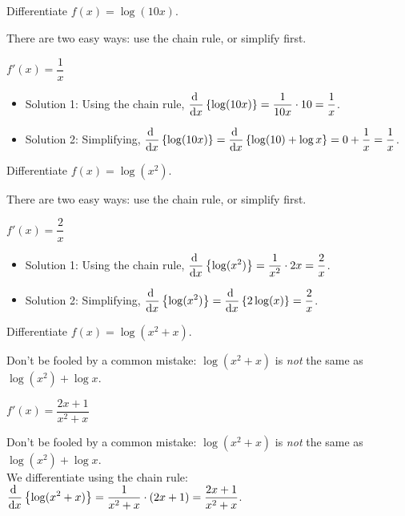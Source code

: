 \subsection*{\Procedural}
\begin{Mquestion}
Differentiate $f(x)=\log(10x)$.
\end{Mquestion}
\begin{hint}
There are two easy ways: use the chain rule, or simplify first.
\end{hint}
\begin{answer}
$f'(x)=\dfrac{1}{x}$
\end{answer}
\begin{solution}
\begin{itemize}
\item Solution 1: Using the chain rule, $\ds\diff{}{x}\left\{\log(10x)\right\}=\dfrac{1}{10x}\cdot 10=\frac{1}{x}$.
\item Solution 2: Simplifying,
$\ds\diff{}{x}\left\{\log(10x)\right\}=\ds\diff{}{x}\left\{\log(10)+\log x\right\} = 0+\frac{1}{x}=\frac{1}{x}$.
\end{itemize}
\end{solution}

\begin{Mquestion}
Differentiate $f(x)=\log(x^2)$.
\end{Mquestion}
\begin{hint}
There are two easy ways: use the chain rule, or simplify first.
\end{hint}
\begin{answer}
$f'(x)=\dfrac{2}{x}$
\end{answer}
\begin{solution}
\begin{itemize}
\item Solution 1: Using the chain rule,
$\ds\diff{}{x}\left\{\log(x^2)\right\}=\frac{1}{x^2}\cdot 2x = \frac{2}{x}$.
\item Solution 2: Simplifying,
$\ds\diff{}{x}\left\{\log(x^2)\right\}= \ds\diff{}{x}\left\{2\log(x)\right\}=   \frac{2}{x}$.
\end{itemize}
\end{solution}

\begin{Mquestion}
Differentiate $f(x)=\log(x^2+x)$.
\end{Mquestion}
\begin{hint}
Don't be fooled by a common mistake: $\log(x^2+x)$ is \emph{not} the same as $\log(x^2)+\log x$.
\end{hint}
\begin{answer}
$f'(x)=\dfrac{2x+1}{x^2+x}$
\end{answer}
\begin{solution}
Don't be fooled by a common mistake: $\log(x^2+x)$ is \emph{not} the same as $\log(x^2)+\log x$. \\
We differentiate using the chain rule:
$\ds\diff{}{x}\left\{\log(x^2+x)\right\}=\dfrac{1}{x^2+x}\cdot(2x+1) = \dfrac{2x+1}{x^2+x}$.
\end{solution}

